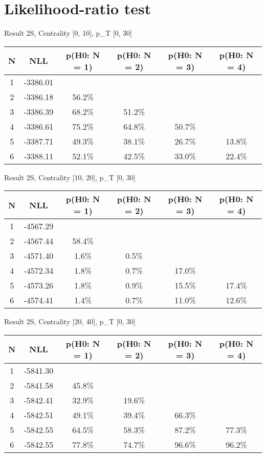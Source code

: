 \section{Likelihood-ratio test}
Result 2S, Centrality [0, 10], p_{T} [0, 30]
\begin{table}[h!]
	\centering
	\begin{tabular}{cc||cccc}
		N & NLL & p(H0: N = 1) & p(H0: N = 2) & p(H0: N = 3) & p(H0: N = 4)\\ 
		\hline
1 & -3386.01 & & & & \\
2 & -3386.18 & 56.2\% & & & \\
3 & -3386.39 & 68.2\% & 51.2\% & & \\
4 & -3386.61 & 75.2\% & 64.8\% & 50.7\% & \\
5 & -3387.71 & 49.3\% & 38.1\% & 26.7\% & 13.8\% \\
6 & -3388.11 & 52.1\% & 42.5\% & 33.0\% & 22.4\% \\
	\end{tabular}
	\label{tab:lab}
\end{table}

Result 2S, Centrality [10, 20], p_{T} [0, 30]
\begin{table}[h!]
	\centering
	\begin{tabular}{cc||cccc}
		N & NLL & p(H0: N = 1) & p(H0: N = 2) & p(H0: N = 3) & p(H0: N = 4)\\ 
		\hline
1 & -4567.29 & & & & \\
2 & -4567.44 & 58.4\% & & & \\
3 & -4571.40 & 1.6\% & 0.5\% & & \\
4 & -4572.34 & 1.8\% & 0.7\% & 17.0\% & \\
5 & -4573.26 & 1.8\% & 0.9\% & 15.5\% & 17.4\% \\
6 & -4574.41 & 1.4\% & 0.7\% & 11.0\% & 12.6\% \\
	\end{tabular}
	\label{tab:lab}
\end{table}

Result 2S, Centrality [20, 40], p_{T} [0, 30]
\begin{table}[h!]
	\centering
	\begin{tabular}{cc||cccc}
		N & NLL & p(H0: N = 1) & p(H0: N = 2) & p(H0: N = 3) & p(H0: N = 4)\\ 
		\hline
1 & -5841.30 & & & & \\
2 & -5841.58 & 45.8\% & & & \\
3 & -5842.41 & 32.9\% & 19.6\% & & \\
4 & -5842.51 & 49.1\% & 39.4\% & 66.3\% & \\
5 & -5842.55 & 64.5\% & 58.3\% & 87.2\% & 77.3\% \\
6 & -5842.55 & 77.8\% & 74.7\% & 96.6\% & 96.2\% \\
	\end{tabular}
	\label{tab:lab}
\end{table}

